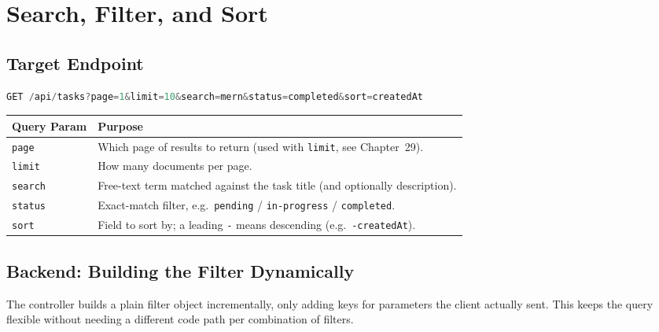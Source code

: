 \chapter{Search, Filter, and Sort}

\section{Target Endpoint}

\begin{lstlisting}[language=JavaScript]
GET /api/tasks?page=1&limit=10&search=mern&status=completed&sort=createdAt
\end{lstlisting}

\begin{table}[h]
\centering
\begin{tabularx}{\textwidth}{l X}
\toprule
\textbf{Query Param} & \textbf{Purpose} \\
\midrule
\texttt{page} & Which page of results to return (used with \texttt{limit}, see Chapter~29). \\
\texttt{limit} & How many documents per page. \\
\texttt{search} & Free-text term matched against the task title (and optionally description). \\
\texttt{status} & Exact-match filter, e.g.\ \texttt{pending} / \texttt{in-progress} / \texttt{completed}. \\
\texttt{sort} & Field to sort by; a leading \texttt{-} means descending (e.g.\ \texttt{-createdAt}). \\
\bottomrule
\end{tabularx}
\end{table}

\section{Backend: Building the Filter Dynamically}

The controller builds a plain filter object incrementally, only adding keys
for parameters the client actually sent. This keeps the query flexible
without needing a different code path per combination of filters.

